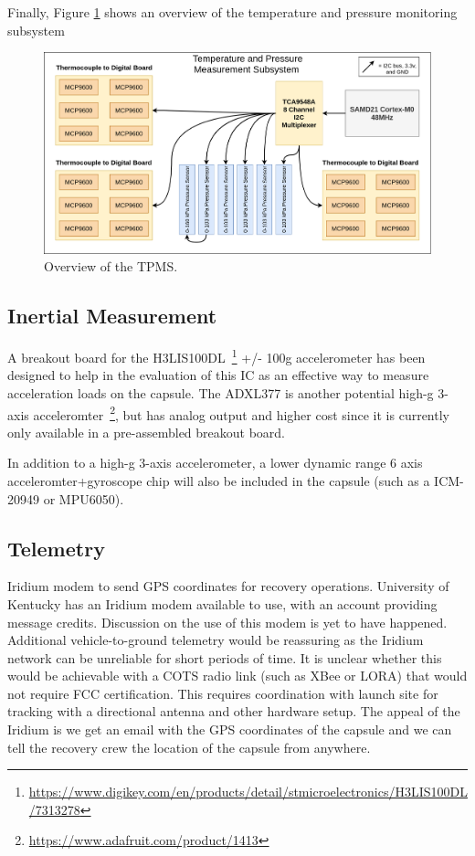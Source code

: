 \documentclass{article}
\begin{document}
Finally, Figure \ref{fig:tpms-overview} shows an overview of the temperature and pressure monitoring subsystem

\begin{figure}[h!]
	\centering
	\includegraphics[width=\textwidth]{images/amtps-temp-pressure-subsystem.png}
	\caption{Overview of the TPMS.}
	\label{fig:tpms-overview}
\end{figure}


\subsection{Inertial Measurement}
A breakout board for the H3LIS100DL~\footnote{\url{https://www.digikey.com/en/products/detail/stmicroelectronics/H3LIS100DL/7313278}} +/- 100g accelerometer has been designed to help in the evaluation of this IC as an effective way to measure acceleration loads on the capsule. The ADXL377 is another potential high-g 3-axis acceleromter~\footnote{\url{https://www.adafruit.com/product/1413}}, but has analog output and higher cost since it is currently only available in a pre-assembled breakout board.

In addition to a high-g 3-axis accelerometer, a lower dynamic range 6 axis acceleromter+gyroscope chip will also be included in the capsule (such as a ICM-20949 or MPU6050).

\subsection{Telemetry}

Iridium modem to send GPS coordinates for recovery operations. University of Kentucky has an Iridium modem available to use, with an account providing message credits. Discussion on the use of this modem is yet to have happened. Additional vehicle-to-ground telemetry would be reassuring as the Iridium network can be unreliable for short periods of time. It is unclear whether this would be achievable with a COTS radio link (such as XBee or LORA) that would not require FCC certification. This requires coordination with launch site for tracking with a directional antenna and other hardware setup. The appeal of the Iridium is we get an email with the GPS coordinates of the capsule and we can tell the recovery crew the location of the capsule from anywhere. 
\end{document}
